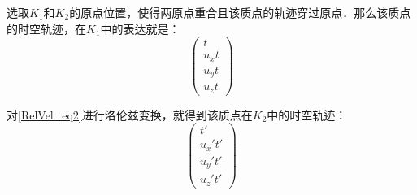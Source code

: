 选取$K_1$和$K_2$的原点位置，使得两原点重合且该质点的轨迹穿过原点．那么该质点的时空轨迹，在$K_1$中的表达就是：
\begin{equation}\label{RelVel_eq2}
\left(\begin{matrix}t\\u_xt\\u_yt\\u_zt\end{matrix} \right) \tag{2}
\end{equation}

对\autoref{RelVel_eq2}进行洛伦兹变换，就得到该质点在$K_2$中的时空轨迹：
\begin{equation}
\left(\begin{matrix}t'\\u_x't'\\u_y't'\\u_z't'\end{matrix} \right) \tag{2}
\end{equation}





